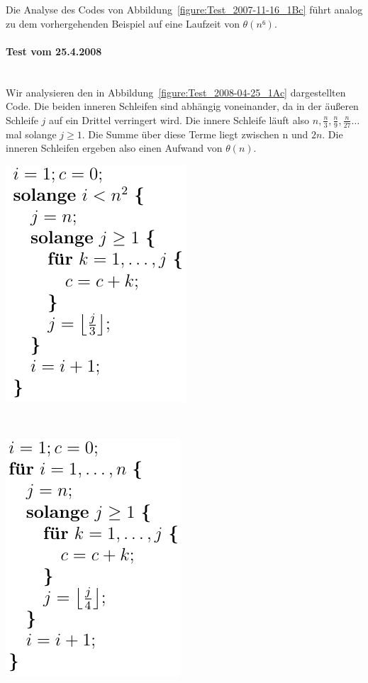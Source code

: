 \documentclass[a4paper, 12pt]{article}
\begin{document}
Die Analyse des Codes von Abbildung~\ref{figure:Test_2007-11-16_1Bc} führt
analog zu dem vorhergehenden Beispiel auf eine Laufzeit von
$θ\left(n⁶\right)$.

\paragraph{Test vom 25.4.2008}~\\

Wir analysieren den in Abbildung~\ref{figure:Test_2008-04-25_1Ac}
dargestellten Code. Die beiden inneren Schleifen sind abhängig voneinander, da
in der äußeren Schleife $j$ auf ein Drittel verringert wird. Die innere
Schleife läuft also $n,\frac{n}{3},\frac{n}{9},\frac{n}{27}\dots$ mal solange
$j≥1$. Die Summe über diese Terme liegt zwischen n und $2n$. Die inneren
Schleifen ergeben also einen Aufwand von $θ\left(n\right)$.

\begin{minipage}[t]{0.45\textwidth}
    \centering
    \includegraphics{Figures/Test_2008-04-25_1Ac}
    \label{figure:Test_2008-04-25_1Ac}
\end{minipage}
\begin{minipage}[t]{0.08\textwidth}~\end{minipage}
\begin{minipage}[t]{0.45\textwidth}
    \centering
    \includegraphics{Figures/Test_2008-04-25_1Bc}
    \label{figure:Test_2008-04-25_1Bc}
\end{minipage}~\\
\end{document}
